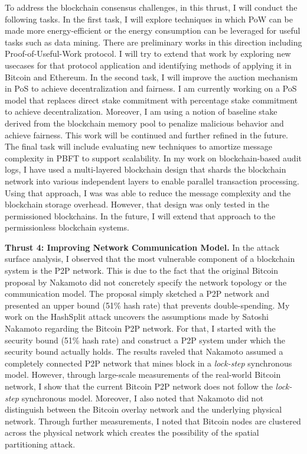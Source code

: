 \documentclass{NSF}
\newcommand{\BfPara}[1]{{\noindent\textbf{#1.}}\xspace}
\begin{document}
To address the blockchain consensus challenges, in this thrust, I will conduct the following tasks. In the first task, I will explore techniques in which PoW can be made more energy-efficient or the energy consumption can be leveraged for useful tasks such as data mining. There are preliminary works in this direction including Proof-of-Useful-Work protocol. I will try to extend that work by exploring new usecases for that protocol application and identifying methods of applying it in Bitcoin and Ethereum. In the second task, I will improve the auction mechanism in PoS to achieve decentralization and fairness. I am currently working on a PoS model that replaces direct stake commitment with percentage stake commitment to achieve decentralization. Moreover, I am using a notion of baseline stake derived from the blockchain memory pool to penalize malicious behavior and achieve fairness. This work will be continued and further refined in the future. The final task will include evaluating new techniques to amortize message complexity in PBFT to support scalability. In my work on blockchain-based audit logs, I have used a multi-layered blockchain design that shards the blockchain network into various independent layers to enable parallel transaction processing. Using that approach, I was was able to reduce the message complexity and the blockchain storage overhead. However, that design was only tested in the permissioned blockchains. In the future, I will extend that approach to the permissionless blockchain systems. 


\vspace{2mm}


\BfPara{Thrust 4: Improving Network Communication Model} In the attack surface analysis, I observed that the most vulnerable component of a blockchain system is the P2P network. This is due to the fact that the original Bitcoin proposal by Nakamoto did not concretely specify the network topology or the communication model. The proposal simply sketched a P2P network and presented an upper bound (51\% hash rate) that prevents double-spending. My work on the HashSplit attack uncovers the assumptions made by Satoshi Nakamoto regarding the Bitcoin P2P network. For that, I started with the security bound (51\% hash rate) and construct a P2P system under which the security bound actually holds. The results raveled that Nakamoto assumed a completely connected P2P network that mines block in a {\em lock-step} synchronous model. However, through large-scale measurements of the real-world Bitcoin network, I show that the current Bitcoin P2P network does not follow the {\em lock-step} synchronous model. Moreover, I also noted that Nakamoto did not distinguish between the Bitcoin overlay network and the underlying physical network. Through further measurements, I noted that Bitcoin nodes are clustered across the physical network which creates the possibility of the spatial partitioning attack. 
\end{document}
